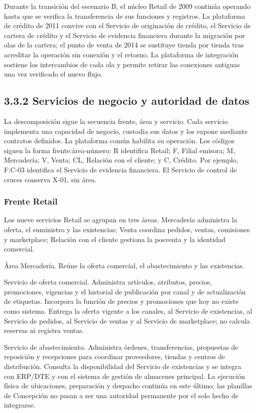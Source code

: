 \documentclass[11pt]{article}
\begin{document}
{Durante la transición del escenario B, el núcleo Retail de 2009 continúa operando hasta que se verifica la transferencia de sus funciones y registros. La plataforma de crédito de 2011 convive con el Servicio de originación de crédito, el Servicio de cartera de crédito y el Servicio de evidencia financiera durante la migración por olas de la cartera; el punto de venta de 2014 se sustituye tienda por tienda tras acreditar la operación sin conexión y el retorno. La plataforma de integración sostiene los intercambios de cada ola y permite retirar las conexiones antiguas una vez verificado el nuevo flujo.}

\subsection{3.3.2 Servicios de negocio y autoridad de datos}

{La descomposición sigue la secuencia frente, área y servicio. Cada servicio implementa una capacidad de negocio, custodia sus datos y los expone mediante contratos definidos. La plataforma común habilita su operación. Los códigos siguen la forma frente:área-número: R identifica Retail; F, Filial emisora; M, Mercadería; V, Venta; CL, Relación con el cliente; y C, Crédito. Por ejemplo, F:C-03 identifica el Servicio de evidencia financiera. El Servicio de control de cruces conserva X-01, sin área.}

\subsubsection{Frente Retail}

{Los nueve servicios Retail se agrupan en tres áreas. Mercadería administra la oferta, el suministro y las existencias; Venta coordina pedidos, ventas, comisiones y marketplace; Relación con el cliente gestiona la posventa y la identidad comercial.}

{Área Mercadería. Reúne la oferta comercial, el abastecimiento y las existencias.}

{Servicio de oferta comercial. Administra artículos, atributos, precios, promociones, vigencias y el historial de publicación por canal y de actualización de etiquetas. Incorpora la función de precios y promociones que hoy no existe como sistema. Entrega la oferta vigente a los canales, al Servicio de existencias, al Servicio de pedidos, al Servicio de ventas y al Servicio de marketplace; no calcula reservas ni registra ventas.}

{Servicio de abastecimiento. Administra órdenes, transferencias, propuestas de reposición y recepciones para coordinar proveedores, tiendas y centros de distribución. Consulta la disponibilidad del Servicio de existencias y se integra con ERP/DTE y con el sistema de gestión de almacenes principal. La ejecución física de ubicaciones, preparación y despacho continúa en este último; las planillas de Concepción no pasan a ser una autoridad permanente por el solo hecho de integrarse.}
\end{document}
